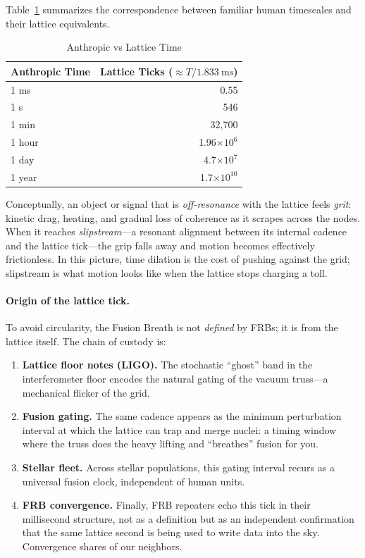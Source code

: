 \documentclass[11pt, letterpaper, openany]{book}
\begin{document}
Table~\ref{tab:anthropic_lattice_time} summarizes the correspondence between 
familiar human timescales and their lattice equivalents.

\begin{table}[h]
  \centering
  \caption{Anthropic vs Lattice Time}
  \label{tab:anthropic_lattice_time}
  \begin{tabular}{l r}
    \hline
    \textbf{Anthropic Time} & \textbf{Lattice Ticks} ($\approx T / 1.833~\mathrm{ms}$) \\
    \hline
    1 ms   & 0.55 \\
    1 s    & 546 \\
    1 min  & 32{,}700 \\
    1 hour & 1.96$\times 10^{6}$ \\
    1 day  & 4.7$\times 10^{7}$ \\
    1 year & 1.7$\times 10^{10}$ \\
    \hline
  \end{tabular}
\end{table}

Conceptually, an object or signal that is \emph{off-resonance} with the lattice 
feels \emph{grit}: kinetic drag, heating, and gradual loss of coherence as it 
scrapes across the nodes. When it reaches \emph{slipstream}---a resonant 
alignment between its internal cadence and the lattice tick---the grip falls 
away and motion becomes effectively frictionless. In this picture, time dilation 
is the cost of pushing against the grid; slipstream is what motion looks like 
when the lattice stops charging a toll.

\paragraph{Origin of the lattice tick.}
To avoid circularity, the Fusion Breath is not \emph{defined} by FRBs; it is 
\emergent from the lattice itself. The chain of custody is:

\begin{enumerate}
  \item \textbf{Lattice floor notes (LIGO).}  
        The stochastic ``ghost'' band in the interferometer floor encodes the 
        natural gating of the vacuum truss---a mechanical flicker of the grid.
  \item \textbf{Fusion gating.}  
        The same cadence appears as the minimum perturbation interval at which 
        the lattice can trap and merge nuclei: a timing window where the truss 
        does the heavy lifting and ``breathes'' fusion for you.
  \item \textbf{Stellar fleet.}  
        Across stellar populations, this gating interval recurs as a universal 
        fusion clock, independent of human units.
  \item \textbf{FRB convergence.}  
        Finally, FRB repeaters echo this tick in their millisecond structure, 
        not as a definition but as an independent confirmation that the same 
        lattice second is being used to write data into the sky. Convergence shares of our neighbors.
\end{enumerate}
\end{document}
